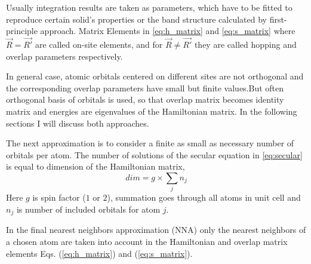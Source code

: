 Usually integration results are taken as parameters, which have to be fitted to reproduce certain solid's properties or the band structure calculated by first-principle approach. Matrix Elements in \ref{eq:h_matrix} and \ref{eq:s_matrix} where $\vec{R} = \vec{R'}$ are called on-site elements, and for $\vec{R} \neq \vec{R'}$ they are called hopping and overlap parameters respectively. 

In general case, atomic orbitals centered on different sites are not orthogonal and the corresponding overlap parameters have small but finite values.But often orthogonal basis of orbitals is used, so that overlap matrix becomes identity matrix and energies are eigenvalues of the Hamiltonian matrix. In the following sections I will discuss both approaches. 

The next approximation is to consider a finite as small as necessary number of orbitals per atom. The number of solutions of the secular equation in \ref{eq:secular} is equal to dimension of the Hamiltonian matrix,
\begin{equation}
dim = g \times \sum_j n_j
\end{equation}
Here $g$ is spin factor ($1$ or $2$), summation goes through all atoms in unit cell and $n_j$ is number of included orbitals for atom $j$.

In the final nearest neighbors approximation (NNA) only the nearest neighbors of a chosen atom are taken into account in the Hamiltonian and overlap matrix elements Eqs. (\ref{eq:h_matrix}) and (\ref{eq:s_matrix}).
